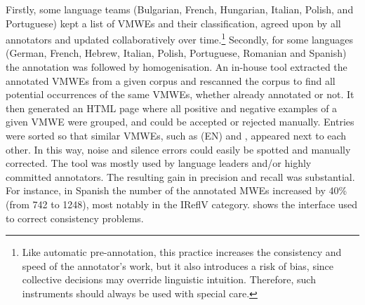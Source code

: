 \documentclass[output=paper,
modfonts,
]{langscibook}
\begin{document}
Firstly, some language teams (Bulgarian, French, Hungarian, Italian, Polish, and Portuguese) kept a list of VMWEs and their classification, agreed upon by all annotators and updated collaboratively over time.\footnote{Like automatic pre-annotation, this practice increases the consistency and speed of the annotator's work, but it also introduces a risk of bias, since collective decisions may override linguistic intuition. Therefore, such instruments should always be used with special care.}
Secondly, for some languages (German, French, Hebrew, Italian, Polish, Portuguese, Romanian and Spanish) the annotation was followed by homogenisation. 
An in-house tool extracted the annotated VMWEs from a given  corpus and rescanned the corpus to find all potential occurrences of the same VMWEs, whether already annotated or not. It then generated an HTML page where all positive and negative examples of a given VMWE were grouped, and could be accepted or rejected manually.
Entries were sorted so that similar VMWEs, such as (EN)  and , appeared next to each other.  %
In this way, noise and silence errors could easily be spotted and manually corrected. The tool was mostly used by language leaders and/or highly committed annotators. The resulting gain in precision and recall was substantial. For instance, in Spanish the number of the annotated MWEs increased by 40\% (from 742 to 1248), most notably in the IReflV category.  shows the interface used to correct consistency problems.
\end{document}
